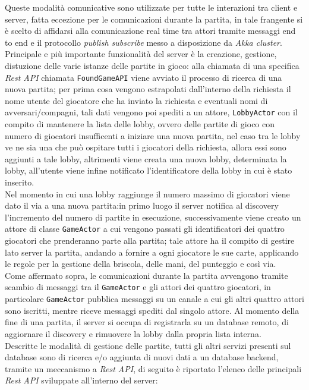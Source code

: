  Queste modalità comunicative sono utilizzate per tutte le interazioni tra client e server, fatta eccezione per le comunicazioni durante la partita, in tale frangente si è scelto di affidarsi alla comunicazione real time tra attori tramite messaggi end to end e il protocollo \textit{publish subscribe} messo a disposizione da \textit{Akka cluster}.
 Principale e più importante funzionalità del server è la creazione, gestione, distuzione delle varie istanze delle partite in gioco:
 alla chiamata di una specifica \textit{Rest API} chiamata \texttt{FoundGameAPI} viene avviato il processo di ricerca di una nuova partita; per prima cosa vengono estrapolati dall'interno della richiesta il nome utente del giocatore che ha inviato la richiesta e eventuali nomi di avversari/compagni, tali dati vengono poi spediti a un attore, \texttt{LobbyActor} con il compito di mantenere la lista delle lobby, ovvero delle partite di gioco con numero di giocatori insufficenti a iniziare una nuova partita, nel caso tra le lobby ve ne sia una che può ospitare tutti i giocatori della richiesta, allora essi sono aggiunti a tale lobby, altrimenti viene creata una nuova lobby, determinata la lobby, all'utente viene infine notificato l'identificatore della lobby in cui è stato inserito. \\
 Nel momento in cui una lobby raggiunge il numero massimo di giocatori viene dato il via a una nuova partita:in primo luogo il server notifica al discovery l'incremento del numero di partite in esecuzione, successivamente viene creato un attore di classe \texttt{GameActor} a cui vengono passati gli identificatori dei quattro giocatori che prenderanno parte alla partita; tale attore ha il compito di gestire lato server la partita, andando a fornire a ogni giocatore le sue carte, applicando le regole per la gestione della briscola, delle mani, del punteggio e così via.\\
 Come affermato sopra, le comunicazioni durante la partita avvengono tramite scambio di messaggi tra il \texttt{GameActor} e gli attori dei quattro giocatori, in particolare \texttt{GameActor} pubblica messaggi su un canale a cui gli altri quattro attori sono iscritti, mentre riceve messaggi spediti dal singolo attore.
 Al momento della fine di una partita, il server si occupa di registrarla su un database remoto, di aggiornare il discovery e rimuovere la lobby dalla propria lista interna.\\
 Descritte le modalità di gestione delle partite, tutti gli altri servizi presenti sul database sono di ricerca e/o aggiunta di nuovi dati a un database backend, tramite un meccanismo a \textit{Rest API}, di seguito è riportato l'elenco delle principali \textit{Rest API} sviluppate all'interno del server:
